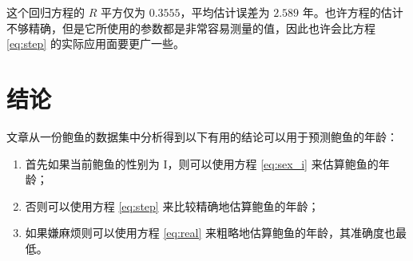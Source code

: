 这个回归方程的 $R$ 平方仅为 $0.3555$，平均估计误差为 $2.589$ 年。也许方程的估计不够精确，但是它所使用的参数都是非常容易测量的值，因此也许会比方程 \ref{eq:step} 的实际应用面要更广一些。

\section{结论}

文章从一份鲍鱼的数据集中分析得到以下有用的结论可以用于预测鲍鱼的年龄：

\begin{enumerate}
  \item 首先如果当前鲍鱼的性别为 I，则可以使用方程 \ref{eq:sex_i} 来估算鲍鱼的年龄；
  \item 否则可以使用方程 \ref{eq:step} 来比较精确地估算鲍鱼的年龄；
  \item 如果嫌麻烦则可以使用方程 \ref{eq:real} 来粗略地估算鲍鱼的年龄，其准确度也最低。
\end{enumerate}
